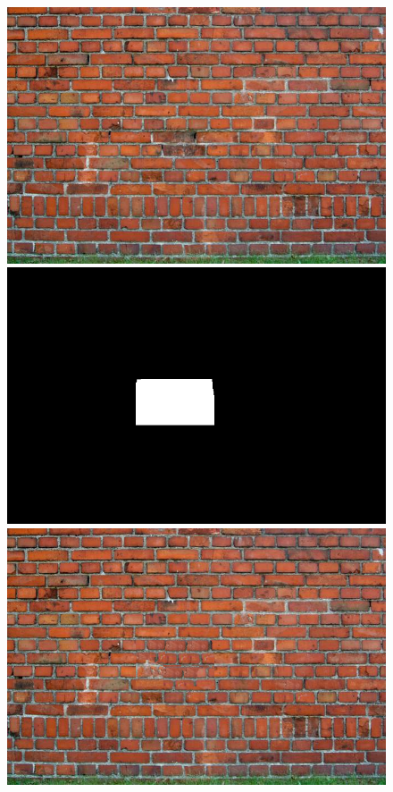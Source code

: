 \documentclass[a4paper, 10pt]{article}
\begin{document}
\begin{figure}[H]
\begin{minipage}{.4\textwidth}
\centering
\includegraphics[scale=0.15]{images/wall3.jpg}
\end{minipage}%
\begin{minipage}{.4\textwidth}
\centering
\includegraphics[scale=0.15]{mask_wall3_29.png}
\end{minipage}%
\begin{minipage}{.4\textwidth}
\centering
\includegraphics[scale=0.15]{wall3_inpainted29.png}
\end{minipage}%
\end{figure}
\end{document}
